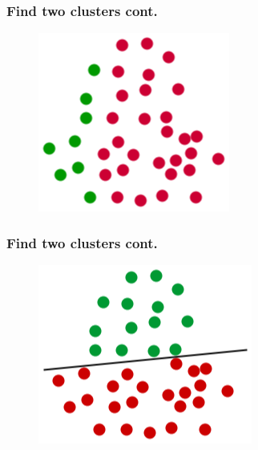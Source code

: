 \documentclass{beamer}
\begin{document}
  \begin{frame}%
    \frametitle{Find two clusters cont.} 
    \begin{figure}
      \includegraphics[scale=.5]{graphics/presentation/clusters2c} 
    \end{figure}
  \end{frame}

  \begin{frame}%
    \frametitle{Find two clusters cont.} 
    \begin{figure}
      \includegraphics[scale=.5]{graphics/presentation/clusters2d} 
    \end{figure}
  \end{frame}
\end{document}
